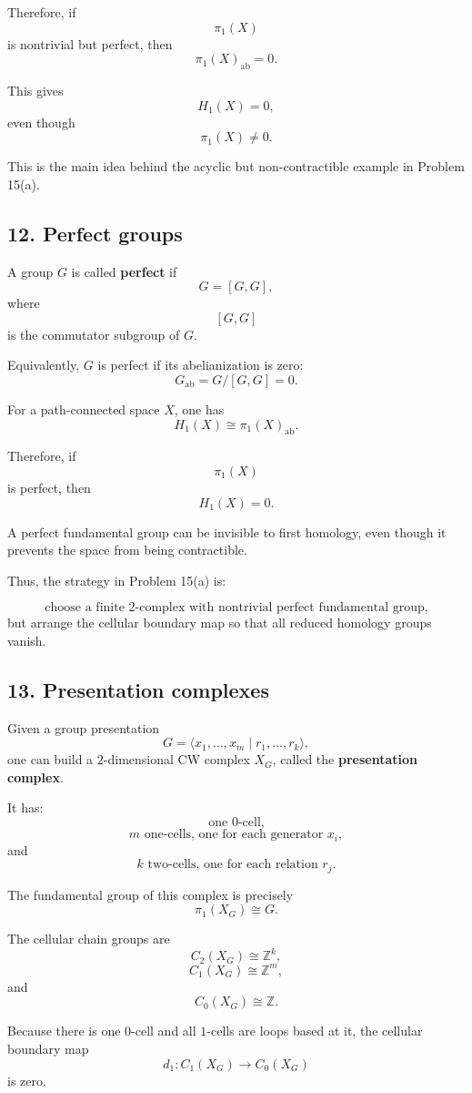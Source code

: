 \documentclass[12pt,a4paper]{article}
\theoremstyle{notespace}
\begin{document}
Therefore, if
\[
\pi_1(X)
\]
is nontrivial but perfect, then
\[
\pi_1(X)_{\mathrm{ab}}=0.
\]

This gives
\[
H_1(X)=0,
\]
even though
\[
\pi_1(X)\neq 0.
\]

This is the main idea behind the acyclic but non-contractible example in Problem 15(a).

\subsection*{12. Perfect groups}

A group \(G\) is called \textbf{perfect} if
\[
G=[G,G],
\]
where
\[
[G,G]
\]
is the commutator subgroup of \(G\).

Equivalently, \(G\) is perfect if its abelianization is zero:
\[
G_{\mathrm{ab}}=G/[G,G]=0.
\]

For a path-connected space \(X\), one has
\[
H_1(X)\cong \pi_1(X)_{\mathrm{ab}}.
\]

Therefore, if
\[
\pi_1(X)
\]
is perfect, then
\[
H_1(X)=0.
\]

A perfect fundamental group can be invisible to first homology, even though it prevents the space from being contractible.

Thus, the strategy in Problem 15(a) is:

\[
\text{choose a finite \(2\)-complex with nontrivial perfect fundamental group,}
\]
but arrange the cellular boundary map so that all reduced homology groups vanish.

\subsection*{13. Presentation complexes}

Given a group presentation
\[
G=
\langle x_1,\ldots,x_m\mid r_1,\ldots,r_k\rangle,
\]
one can build a \(2\)-dimensional CW complex \(X_G\), called the \textbf{presentation complex}.

It has:
\[
\text{one \(0\)-cell,}
\]
\[
m\text{ one-cells, one for each generator }x_i,
\]
and
\[
k\text{ two-cells, one for each relation }r_j.
\]

The fundamental group of this complex is precisely
\[
\pi_1(X_G)\cong G.
\]

The cellular chain groups are
\[
C_2(X_G)\cong \mathbb Z^k,
\]
\[
C_1(X_G)\cong \mathbb Z^m,
\]
and
\[
C_0(X_G)\cong \mathbb Z.
\]

Because there is one \(0\)-cell and all \(1\)-cells are loops based at it, the cellular boundary map
\[
d_1:C_1(X_G)\to C_0(X_G)
\]
is zero.
\end{document}
